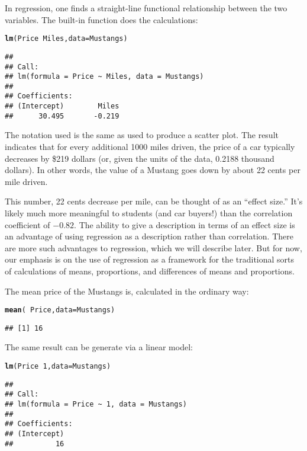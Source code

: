 \documentclass[11pt]{article}\usepackage[]{graphicx}\usepackage[]{color}
\makeatletter
\newcommand{\hlnum}[1]{\textcolor[rgb]{0.686,0.059,0.569}{#1}}%
\newcommand{\hlopt}[1]{\textcolor[rgb]{0,0,0}{#1}}%
\newcommand{\hlstd}[1]{\textcolor[rgb]{0.345,0.345,0.345}{#1}}%
\newcommand{\hlkwc}[1]{\textcolor[rgb]{0.333,0.667,0.333}{#1}}%
\newcommand{\hlkwd}[1]{\textcolor[rgb]{0.737,0.353,0.396}{\textbf{#1}}}%
\newenvironment{kframe}{%
 \def\at@end@of@kframe{}%
 \ifinner\ifhmode%
  \def\at@end@of@kframe{\end{minipage}}%
  \begin{minipage}{\columnwidth}%
 \fi\fi%
 \def\FrameCommand##1{\hskip\@totalleftmargin \hskip-\fboxsep
 \colorbox{shadecolor}{##1}\hskip-\fboxsep
     \hskip-\linewidth \hskip-\@totalleftmargin \hskip\columnwidth}%
 \MakeFramed {\advance\hsize-\width
   \@totalleftmargin\z@ \linewidth\hsize
   \@setminipage}}%
 {\par\unskip\endMakeFramed%
 \at@end@of@kframe}
\newenvironment{knitrout}{}{} %
\makeatother
\begin{document}
In regression, one finds a straight-line functional relationship between the two variables.
The built-in \R{}  function does the calculations:
\begin{knitrout}
\color{fgcolor}\begin{kframe}
\begin{alltt}
\hlkwd{lm}\hlstd{(Price} \hlopt{~} \hlstd{Miles,} \hlkwc{data} \hlstd{= Mustangs)}
\end{alltt}
\begin{verbatim}
## 
## Call:
## lm(formula = Price ~ Miles, data = Mustangs)
## 
## Coefficients:
## (Intercept)        Miles  
##      30.495       -0.219
\end{verbatim}
\end{kframe}
\end{knitrout}
The notation used is the same as used to produce a scatter plot.  
The result indicates that for every additional 1000 miles driven, the price of a car 
typically decreases by \$219 dollars (or, given the units of the data, 0.2188 thousand 
dollars).  In other words, the value of a Mustang goes down by about 22 cents per mile 
driven.

This number, 22 cents decrease per mile, can be thought of as an ``effect size.''  It's likely much more meaningful to students (and car buyers!) than the correlation coefficient of $-0.82$.  The ability to give a description in terms of an effect size is an advantage of using regression as a description rather than correlation.  There are more such advantages to regression, which we will describe later.  But for now, our emphasis is on the use of regression as a framework for the traditional sorts of calculations of means, proportions, and differences of means and proportions.

The mean price of the Mustangs is, calculated in the ordinary way:
\begin{knitrout}
\color{fgcolor}\begin{kframe}
\begin{alltt}
\hlkwd{mean}\hlstd{(}\hlopt{~} \hlstd{Price,} \hlkwc{data} \hlstd{= Mustangs)}
\end{alltt}
\begin{verbatim}
## [1] 16
\end{verbatim}
\end{kframe}
\end{knitrout}

The same result can be generate via a linear model:
\begin{knitrout}
\color{fgcolor}\begin{kframe}
\begin{alltt}
\hlkwd{lm}\hlstd{(Price} \hlopt{~} \hlnum{1}\hlstd{,} \hlkwc{data} \hlstd{= Mustangs)}
\end{alltt}
\begin{verbatim}
## 
## Call:
## lm(formula = Price ~ 1, data = Mustangs)
## 
## Coefficients:
## (Intercept)  
##          16
\end{verbatim}
\end{kframe}
\end{knitrout}
\end{document}
